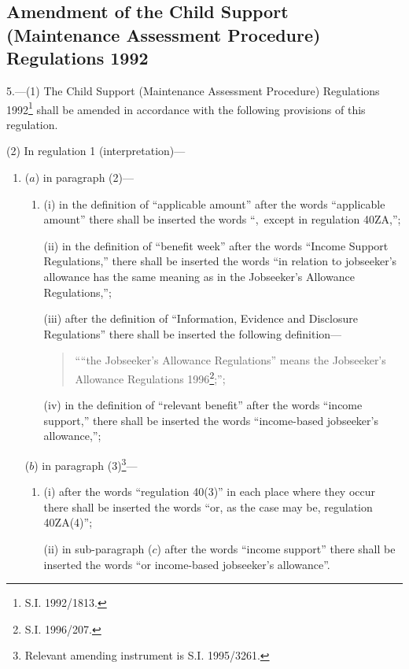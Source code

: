\documentclass[a4paper]{article}
\begin{document}
\subsection[5. Amendment of the Child Support (Maintenance Assessment Procedure) Regulations 1992]{Amendment of the Child Support (Maintenance Assessment Procedure) Regulations 1992}

5.—(1) The Child Support (Maintenance Assessment Procedure) Regulations 1992\footnote{\frenchspacing S.I. 1992/1813.} shall be amended in accordance with the following provisions of this regulation.

(2) In regulation 1 (interpretation)—
\begin{enumerate}\item[]
($a$) in paragraph (2)—
\begin{enumerate}\item[]
(i) in the definition of “applicable amount” after the words “applicable amount” there shall be inserted the words “,~except in regulation 40ZA,”;

(ii) in the definition of “benefit week” after the words “Income Support Regulations,” there shall be inserted the words “in relation to jobseeker’s allowance has the same meaning as in the Jobseeker’s Allowance Regulations,”;

(iii) after the definition of “Information, Evidence and Disclosure Regulations” there shall be inserted the following definition—
\begin{quotation}
““the Jobseeker’s Allowance Regulations” means the Jobseeker’s Allowance Regulations 1996\footnote{\frenchspacing S.I. 1996/207.};”;
\end{quotation}

(iv) in the definition of “relevant benefit” after the words “income support,” there shall be inserted the words “income-based jobseeker’s allowance,”;
\end{enumerate}

($b$) in paragraph (3)\footnote{\frenchspacing Relevant amending instrument is S.I. 1995/3261.}—
\begin{enumerate}\item[]
(i) after the words “regulation 40(3)” in each place where they occur there shall be inserted the words “or, as the case may be, regulation 40ZA(4)”;

(ii) in sub-paragraph ($c$) after the words “income support” there shall be inserted the words “or income-based jobseeker’s allowance”.
\end{enumerate}
\end{enumerate}
\end{document}
